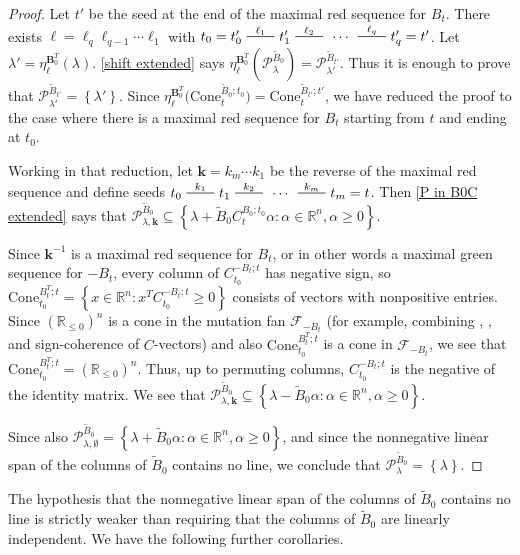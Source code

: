 \documentclass{amsart}
\theoremstyle{definition}
\theoremstyle{remark}
\numberwithin{equation}{section}
\newcommand{\reals}{\mathbb R}
\newcommand{\edge}{\,\,\rule[2.7pt]{20pt}{0.5pt}\,\,}
\newcommand{\set}[1]{{\left\lbrace #1 \right\rbrace}}
\newcommand{\F}{{\mathcal F}}
\newcommand{\0}{{\mathbf{0}}}
\newcommand{\Cone}{\mathrm{Cone}}
\newcommand{\kk}{\mathbf{k}}
\renewcommand{\ll}{{\boldsymbol\ell}}
\newcommand{\tB}{{\tilde{B}}}
\newcommand{\BB}{\mathbf{B}}
\renewcommand{\P}{\mathcal{P}}
\begin{document}
\begin{proof}%
Let $t'$ be the seed at the end of the maximal red sequence for $B_t$.
There exists $\ll=\ell_q\ell_{q-1}\cdots\ell_1$ with $t_0=t'_0\overset{\ell_1}{\edge}t'_1\overset{\ell_2}{\edge}\,\cdots\,\overset{\ell_q}{\edge}t'_q=t'$.
Let $\lambda'=\eta^{\BB_0^T}_\ll\!(\lambda)$.
\cref{shift extended} says $\eta^{\BB_0^T}_\ll\!(\P^{\tB_0}_\lambda)=\P^{\tB_{t'}}_{\lambda'}$.
Thus it is enough to prove that $\P^{\tB_{t'}}_{\lambda'}=\set{\lambda'}$.
Since $\eta_\ll^{\BB_0^T}\bigl(\Cone_t^{\tB_0;t_0}\bigr)=\Cone_t^{\tB_{t'};t'}$, we have reduced the proof to the case where there is a maximal red sequence for $B_t$ starting from $t$ and ending at $t_0$.

Working in that reduction, let $\kk=k_m\cdots k_1$ be the reverse of the maximal red sequence and define seeds $t_0\overset{k_1}{\edge}t_1\overset{k_2}{\edge}\,\cdots\,\overset{k_m}{\edge}t_m=t$.
Then \cref{P in B0C extended} says that $\P^{\tB_0}_{\lambda,\kk}\subseteq\set{\lambda+\tB_0C_t^{B_0;t_0}\alpha:\alpha\in\reals^n,\alpha\ge0}$.

Since $\kk^{-1}$ is a maximal red sequence for $B_t$, or in other words a maximal green sequence for $-B_t$, every column of $C_{t_0}^{-B_t;t}$ has negative sign, so $\Cone_{t_0}^{B_t^T;t}=\set{x\in\reals^n:x^TC_{t_0}^{-B_t;t}\ge0}$ consists of vectors with nonpositive entries.
Since $\left(\reals_{\le0}\right)^n$ is a cone in the mutation fan $\F_{-B_t}$ (for example, combining \mbox{\cite[Proposition~7.1]{universal}}, \mbox{\cite[Proposition~8.9]{universal}}, and sign-coherence of $C$-vectors) and also $\Cone_{t_0}^{B_t^T;t}$ is a cone in $\F_{-B_t}$, we see that $\Cone_{t_0}^{B_t^T;t}=\left(\reals_{\le0}\right)^n$.
Thus, up to permuting columns, $C_{t_0}^{-B_t;t}$ is the negative of the identity matrix.
We see that $\P^{\tB_0}_{\lambda,\kk}\subseteq\set{\lambda-\tB_0\alpha:\alpha\in\reals^n,\alpha\ge0}$.

Since also $\P^{\tB_0}_{\lambda,\emptyset}=\set{\lambda+\tB_0\alpha:\alpha\in\reals^n,\alpha\ge0}$, and since the nonnegative linear span of the columns of $\tB_0$ contains no line, we conclude that $\P^{\tB_0}_\lambda=\set{\lambda}$.
\end{proof}

The hypothesis that the nonnegative linear span of the columns of $\tB_0$ contains no line is strictly weaker than requiring that the columns of $\tB_0$ are linearly independent.
We have the following further corollaries.
\end{document}

